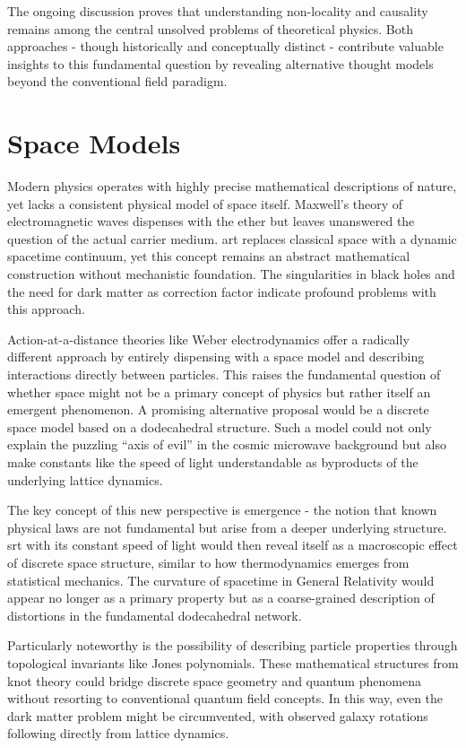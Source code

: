 The ongoing discussion proves that understanding non-locality and causality remains among the central unsolved problems of theoretical physics.
Both approaches - though historically and conceptually distinct - contribute valuable insights to this fundamental question by revealing alternative thought models beyond
the conventional field paradigm.

\section{Space Models}
Modern physics operates with highly precise mathematical descriptions of nature, yet lacks a consistent physical model of space itself. Maxwell's theory of
electromagnetic waves dispenses with the ether but leaves unanswered the question of the actual carrier medium. \gls{art} replaces classical space with a dynamic
spacetime continuum, yet this concept remains an abstract mathematical construction without mechanistic foundation. The singularities in black holes and the
need for dark matter as correction factor indicate profound problems with this approach.

Action-at-a-distance theories like Weber electrodynamics offer a radically different approach by entirely dispensing with a space model and describing interactions directly between particles.
This raises the fundamental question of whether space might not be a primary concept of physics but rather itself an emergent phenomenon. A
promising alternative proposal would be a discrete space model based on a dodecahedral structure. Such a model could not only explain the puzzling \enquote{axis of evil} in the
cosmic microwave background but also make constants like the speed of light understandable as byproducts of the underlying lattice dynamics.

The key concept of this new perspective is emergence - the notion that known physical laws are not fundamental but arise from a deeper underlying
structure. \gls{srt} with its constant speed of light would then reveal itself as a macroscopic effect of discrete space structure, similar
to how thermodynamics emerges from statistical mechanics. The curvature of spacetime in General Relativity would appear no longer as a primary property but
as a coarse-grained description of distortions in the fundamental dodecahedral network.

Particularly noteworthy is the possibility of describing particle properties through topological invariants like Jones polynomials. These mathematical
structures from knot theory could bridge discrete space geometry and quantum phenomena without resorting to conventional quantum field concepts. In this
way, even the dark matter problem might be circumvented, with observed galaxy rotations following directly from lattice dynamics.

